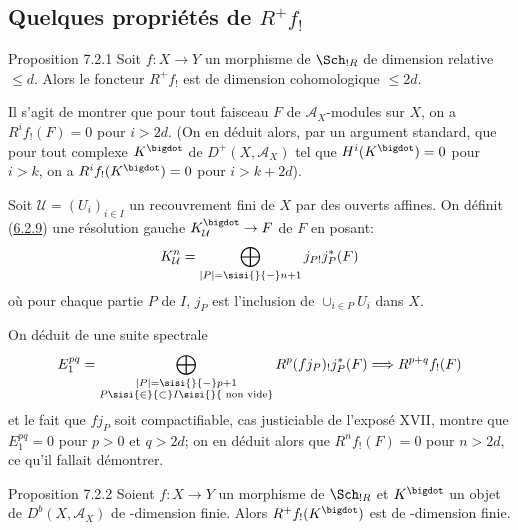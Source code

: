 \subsection[Quelques propriétés de $R^{+}f_{!}$]{Quelques propriétés de
  $R^{+}f_{!}$}
\pageoriginale

\begin{enonce*}{Proposition 7.2.1}
Soit $f:X\rightarrow Y$ un morphisme de $\Sch_{!R}$ de dimension
relative $\leq d$. Alors le foncteur $R^{+}f_{!}$ est de dimension
cohomologique $\leq 2d$.
\end{enonce*}

Il s'agit de montrer que pour tout faisceau $F$ de
$\mathcal{A}_{X}$-modules sur $X$, on a $R^{i}f_{!}(F)=0$ pour
$i>2d$. (On en déduit alors, par un argument standard, que pour tout
complexe $K^{\bigdot}$ de $D^{+}(X,\mathcal{A}_{X})$ tel que
$H^{i}(K^{\bigdot})=0$ pour $i>k$, on a $R^{i}f_{!}(K^{\bigdot})=0$
pour $i>k+2d$).

Soit $\mathcal{U}=(U_{i})_{i\in I}$ un recouvrement fini de $X$ par
des ouverts affines. On définit (\hyperref[XVII.prop6.2.9]{6.2.9}) une résolution gauche
$K^{\bigdot}_{\mathcal{U}}\rightarrow F$ de $F$ en posant:
\[
K^{n}_{\mathcal{U}}=\bigoplus_{|P|=\sisi{}{-}n+1} j_{P!}j^{*}_{P}(F)
\]
où pour chaque partie $P$ de $I$, $j_{P}$ est l'inclusion de
$\cup_{i\in P} U_{i}$ dans $X$.

On déduit de  une suite spectrale
\[
E^{pq}_{1}=\bigoplus_{\substack{|P|=\sisi{}{-}p+1\\ P\sisi{\in}{\subset} I\sisi{}{\text{ non vide}}}} R^{p}(fj_{P})_{!}
j^{\ast}_{P}(F)\Longrightarrow R^{p+q}f_{!}(F)
\]
et le fait que $fj_{P}$ soit compactifiable, cas justiciable de
l'exposé XVII, montre que $E^{pq}_{1}=0$ pour $p>0$ et $q>2d$; on en
déduit alors que $R^{n}f_{!}(F)=0$ pour $n>2d$, ce qu'il fallait
démontrer.

\begin{enonce*}{Proposition 7.2.2}
Soient $f:X\rightarrow Y$ un morphisme de $\Sch_{!R}$ et
$K^{\bigdot}$ un objet de $D^{b}(X,\mathcal{A}_{X})$ de \tTor-dimension
finie. Alors $R^{+}f_{!}(K^{\bigdot})$ est de \tTor-dimension finie.
\end{enonce*}

